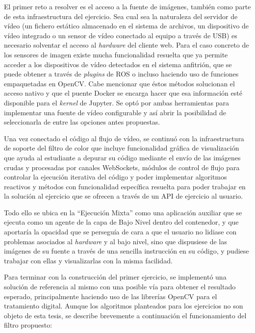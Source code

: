 El primer reto a resolver es el acceso a la fuente de imágenes, también como parte de esta infraestructura del ejercicio. Sea cual sea la naturaleza del servidor de vídeo (un fichero estático almacenado en el sistema de archivos, un dispositivo de vídeo integrado o un sensor de vídeo conectado al equipo a través de USB) es necesario solventar el acceso al \textit{hardware} del cliente web. Para el caso concreto de los sensores de imagen existe mucha funcionalidad resuelta que ya permite acceder a los dispositivos de vídeo detectados en el sistema anfitrión, que se puede obtener a través de \textit{plugins} de ROS o incluso haciendo uso de funciones empaquetadas en OpenCV. Cabe mencionar que éstos métodos solucionan el acceso nativo y que el puente Docker se encarga hacer que esa información esté disponible para el \textit{kernel} de Jupyter. Se optó por ambas herramientas para implementar una fuente de vídeo configurable y así abrir la posibilidad de seleccionarla de entre las opciones antes propuestas.

Una vez conectado el código al flujo de vídeo, se continuó con la infraestructura de soporte del filtro de color que incluye funcionalidad gráfica de visualización que ayuda al estudiante a depurar su código mediante el envío de las imágenes crudas y procesadas por canales WebSockets, módulos de control de flujo para controlar la ejecución iterativa del código y poder implementar algoritmos reactivos y métodos con funcionalidad específica resuelta para poder trabajar en la solución al ejercicio que se ofrecen a través de un API de ejercicio al usuario.

Todo ello se ubica en la ``Ejecución Mixta'' como una aplicación auxiliar que se ejecuta como un agente de la capa de Bajo Nivel dentro del contenedor, y que aportaría la opacidad que se perseguía de cara a que el usuario no lidiase con problemas asociados al \textit{hardware} y al bajo nivel, sino que dispusiese de las imágenes de su fuente a través de una sencilla instrucción en su código, y pudiese trabajar con ellas y visualizarlas con la misma facilidad.

Para terminar con la construcción del primer ejercicio, se implementó una solución de referencia al mismo con una posible vía para obtener el resultado esperado, principalmente haciendo uso de las librerías OpenCV para el tratamiento digital. Aunque los algoritmos planteados para los ejercicios no son objeto de esta tesis, se describe brevemente a continuación el funcionamiento del filtro propuesto:

